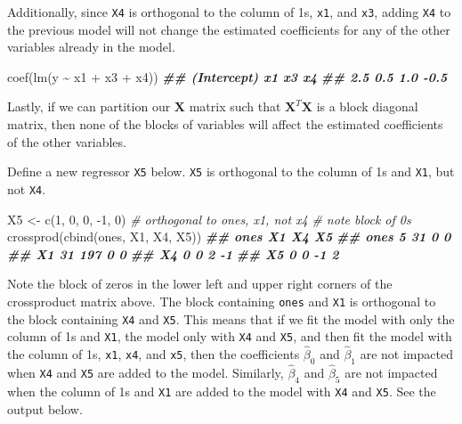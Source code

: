 \documentclass[
]{book}
\newenvironment{Shaded}{\begin{snugshade}}{\end{snugshade}}
\newcommand{\CommentTok}[1]{\textcolor[rgb]{0.56,0.35,0.01}{\textit{#1}}}
\newcommand{\DecValTok}[1]{\textcolor[rgb]{0.00,0.00,0.81}{#1}}
\newcommand{\DocumentationTok}[1]{\textcolor[rgb]{0.56,0.35,0.01}{\textbf{\textit{#1}}}}
\newcommand{\FunctionTok}[1]{\textcolor[rgb]{0.00,0.00,0.00}{#1}}
\newcommand{\NormalTok}[1]{#1}
\newcommand{\OtherTok}[1]{\textcolor[rgb]{0.56,0.35,0.01}{#1}}
\newcommand{\SpecialCharTok}[1]{\textcolor[rgb]{0.00,0.00,0.00}{#1}}
\theoremstyle{definition}
\theoremstyle{definition}
\theoremstyle{definition}
\theoremstyle{definition}
\theoremstyle{remark}
\begin{document}
Additionally, since \texttt{X4} is orthogonal to the column of 1s, \texttt{x1}, and
\texttt{x3}, adding \texttt{X4} to the previous model will not change the estimated
coefficients for any of the other variables already in the model.

\begin{Shaded}
\begin{Highlighting}[]
\FunctionTok{coef}\NormalTok{(}\FunctionTok{lm}\NormalTok{(y }\SpecialCharTok{\textasciitilde{}}\NormalTok{ x1 }\SpecialCharTok{+}\NormalTok{ x3 }\SpecialCharTok{+}\NormalTok{ x4))}
\DocumentationTok{\#\# (Intercept)          x1          x3          x4 }
\DocumentationTok{\#\#         2.5         0.5         1.0        {-}0.5}
\end{Highlighting}
\end{Shaded}

Lastly, if we can partition our \(\mathbf{X}\) matrix such that
\(\mathbf{X}^T \mathbf{X}\) is a block diagonal matrix, then none of the
blocks of variables will affect the estimated coefficients of the other
variables.

Define a new regressor \texttt{X5} below. \texttt{X5} is orthogonal to the column of
1s and \texttt{X1}, but not \texttt{X4}.

\begin{Shaded}
\begin{Highlighting}[]
\NormalTok{X5 }\OtherTok{\textless{}{-}} \FunctionTok{c}\NormalTok{(}\DecValTok{1}\NormalTok{, }\DecValTok{0}\NormalTok{, }\DecValTok{0}\NormalTok{, }\SpecialCharTok{{-}}\DecValTok{1}\NormalTok{, }\DecValTok{0}\NormalTok{) }\CommentTok{\# orthogonal to ones, x1, not x4}
\CommentTok{\# note block of 0s}
\FunctionTok{crossprod}\NormalTok{(}\FunctionTok{cbind}\NormalTok{(ones, X1, X4, X5))}
\DocumentationTok{\#\#      ones  X1 X4 X5}
\DocumentationTok{\#\# ones    5  31  0  0}
\DocumentationTok{\#\# X1     31 197  0  0}
\DocumentationTok{\#\# X4      0   0  2 {-}1}
\DocumentationTok{\#\# X5      0   0 {-}1  2}
\end{Highlighting}
\end{Shaded}

Note the block of zeros in the lower left and upper right corners of the
crossproduct matrix above. The block containing \texttt{ones} and \texttt{X1} is
orthogonal to the block containing \texttt{X4} and \texttt{X5}. This means that if we
fit the model with only the column of 1s and \texttt{X1}, the model only with
\texttt{X4} and \texttt{X5}, and then fit the model with the column of 1s, \texttt{x1}, \texttt{x4},
and \texttt{x5}, then the coefficients \(\hat{\beta}_{0}\) and \(\hat{\beta}_{1}\)
are not impacted when \texttt{X4} and \texttt{X5} are added to the model. Similarly,
\(\hat{\beta}_{4}\) and \(\hat{\beta}_{5}\) are not impacted when the column
of 1s and \texttt{X1} are added to the model with \texttt{X4} and \texttt{X5}. See the output
below.
\end{document}
